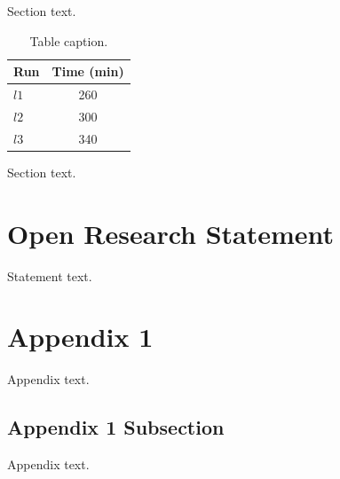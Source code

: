 \documentclass[draft]{agujournal2025}
\begin{document}
Section text.



\begin{table}
\caption{Table caption.}
\centering
\begin{tabular}{l c}
    \hline
        Run  & Time (min)  \\
   \hline
      $l1$  & 260   \\
      $l2$  & 300   \\
      $l3$  & 340   \\
    \hline
\end{tabular}
\end{table}

Section text.


\section*{Open Research Statement}

Statement text.



%



\appendix  %

\section{Appendix 1}
Appendix text.

\subsection{Appendix 1 Subsection}
Appendix text.
\end{document}
